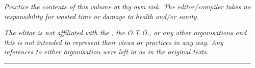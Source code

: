 {\textit{Practice the contents of this volume at thy own risk. The editor/compiler takes no responsibility for wasted time or damage to health and/or sanity.}

\textit{The editor is not affiliated with the \Argentium{}{} , the O.T.O., or any other organisations and this is not intended to represent their views or practices in any way. Any references to either organisation were left in as in the original texts.}

\begin{center}
  \rule{1in}{0.5pt}
\end{center}
\vspace*{\fill}
}
